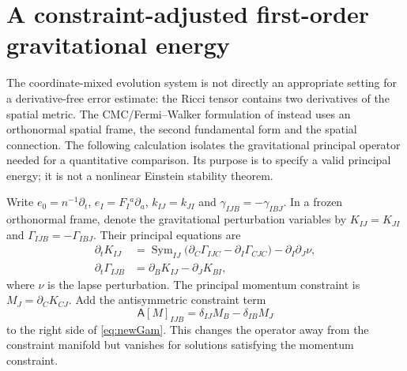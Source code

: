 \documentclass[11pt,a4paper]{article}
\theoremstyle{remark}
\begin{document}
\section{A constraint-adjusted first-order gravitational energy}
\label{sec:constraint-adjusted}
The coordinate-mixed evolution system is not directly an appropriate setting for a derivative-free error estimate: the Ricci tensor contains two derivatives of the spatial metric. The CMC/Fermi--Walker formulation of \cite{FRS} instead uses an orthonormal spatial frame, the second fundamental form and the spatial connection. The following calculation isolates the gravitational principal operator needed for a quantitative comparison. Its purpose is to specify a valid principal energy; it is not a nonlinear Einstein stability theorem.

Write $e_0=n^{-1}\partial_t$, $e_I=F_I{}^a\partial_a$, $k_{IJ}=k_{JI}$ and $\gamma_{IJB}=-\gamma_{IBJ}$. In a frozen orthonormal frame, denote the gravitational perturbation variables by $K_{IJ}=K_{JI}$ and $\Gamma_{IJB}=-\Gamma_{IBJ}$. Their principal equations are
\begin{align}
\partial_t K_{IJ}&=\operatorname{Sym}_{IJ}\bigl(\partial_C\Gamma_{IJC}-\partial_I\Gamma_{CJC}\bigr)-\partial_I\partial_J\nu,\label{eq:newK}\\
\partial_t\Gamma_{IJB}&=\partial_BK_{IJ}-\partial_JK_{BI},\label{eq:newGam}
\end{align}
where $\nu$ is the lapse perturbation. The principal momentum constraint is $M_J=\partial_C K_{CJ}$. Add the antisymmetric constraint term
\begin{equation}\label{eq:newadjust}
\mathsf A[M]_{IJB}=\delta_{IJ}M_B-\delta_{IB}M_J
\end{equation}
to the right side of \eqref{eq:newGam}. This changes the operator away from the constraint manifold but vanishes for solutions satisfying the momentum constraint.
\end{document}
